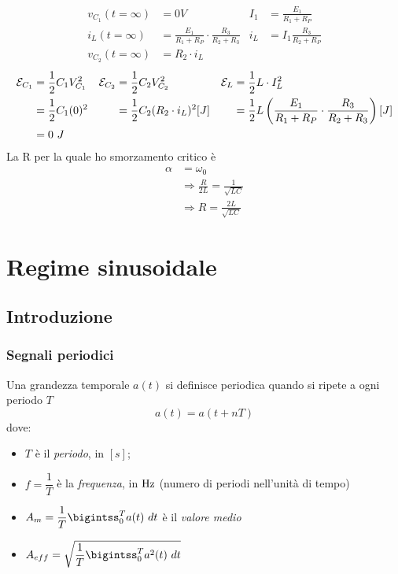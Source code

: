 \documentclass{article}
\begin{document}
\begin{enumerate}[label=\protect\circled{\arabic*}]
\begin{center}
    \end{center}
    \begin{align*}
        v_{C_1}(t=\infty) &= 0V & I_1 &= \frac{E_1}{R_1+R_P} \\ 
        i_L(t=\infty) &=\frac{E_1}{R_1+R_P}\cdot \frac{R_3}{R_2+R_3} & i_L &=I_1 \frac{R_3}{R_2+R_P} \\
        v_{C_2}(t=\infty) &= R_2\cdot i_L
    \end{align*}
    \begin{align*}
        \mathcal{E}_{C_1} &= \frac{1}{2}C_1V_{C_1}^2 & \mathcal{E}_{C_2} &= \frac{1}{2}C_2V_{C_2}^2 & \mathcal{E}_L &= \frac{1}{2}L\cdot I_L^2\\
        &=\frac{1}{2}C_1(0)^2 & &=\frac{1}{2}C_2(R_2\cdot i_L)^2 [J] & &=\frac{1}{2}L\left(\frac{E_1}{R_1+R_P}\cdot \frac{R_3}{R_2+R_3}\right) [J]\\
        &=0 \ J
    \end{align*}
    La R per la quale ho smorzamento critico è
    \begin{align*}
        \alpha &= \omega_0 \\
        &\Rightarrow \frac{R}{2L} = \frac{1}{\sqrt{LC}}\\
        &\Rightarrow R = \frac{2L}{\sqrt{LC}}
    \end{align*}
\end{enumerate}





\section{Regime sinusoidale}
\subsection{Introduzione}


\subsubsection{Segnali periodici}
Una grandezza temporale $a(t)$ si definisce periodica quando si ripete a ogni periodo $T$
\[a(t)=a(t+nT) \tag*{$\forall t$}\]
dove:
\begin{itemize}
    \item $T$ è il \textit{periodo}, in $[s]$;
    \item $f=\dfrac{1}{T}$ è la \textit{frequenza}, in $\text{Hz}$ (numero di periodi nell'unità di tempo)
    \item $A_m=\dfrac{1}{T}\bigintss_0^Ta(t)\ dt$ è il \textit{valore medio}
    \item $A_{eff}=\sqrt{\dfrac{1}{T}\bigintss_0^Ta^2(t)\ dt}$
\end{itemize}
\end{document}
